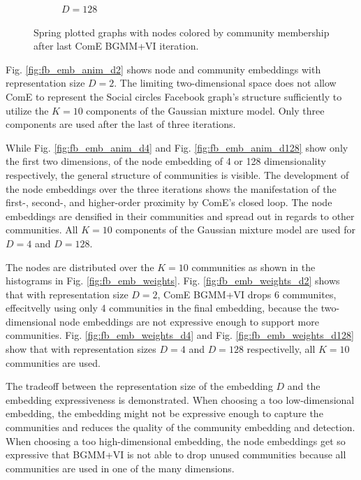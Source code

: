\documentclass[conference]{IEEEtran}
\begin{document}
\begin{figure}[htbp]
\begin{subfigure}{.33\textwidth}
        \caption{$D=128$}
    \end{subfigure}%
    \caption{Spring plotted graphs with nodes colored by community membership after last ComE BGMM+VI iteration.}
    \label{fig:fb_graphs}
\end{figure}

Fig. \ref{fig:fb_emb_anim_d2} shows node and community embeddings with representation size $D=2$. The limiting two-dimensional space does not allow ComE to represent the Social circles Facebook graph's structure sufficiently to utilize the $K=10$ components of the Gaussian mixture model. Only three components are used after the last of three iterations.

While Fig. \ref{fig:fb_emb_anim_d4} and Fig. \ref{fig:fb_emb_anim_d128} show only the first two dimensions, of the node embedding of 4 or 128 dimensionality respectively, the general structure of communities is visible. The development of the node embeddings over the three iterations shows the manifestation of the first-, second-, and higher-order proximity by ComE's closed loop. The node embeddings are densified in their communities and spread out in regards to other communities. All $K=10$ components of the Gaussian mixture model are used for $D=4$ and $D=128$.

The nodes are distributed over the $K=10$ communities as shown in the histograms in Fig. \ref{fig:fb_emb_weights}. Fig. \ref{fig:fb_emb_weights_d2} shows that with representation size $D=2$, ComE BGMM+VI drops 6 communites, effecitvelly using only 4 communities in the final embedding, because the two-dimensional node embeddings are not expressive enough to support more communities. Fig. \ref{fig:fb_emb_weights_d4} and Fig. \ref{fig:fb_emb_weights_d128} show that with representation sizes $D=4$ and $D=128$ respectivelly, all $K=10$ communities are used.

The tradeoff between the representation size of the embedding $D$ and the embedding expressiveness is demonstrated. When choosing a too low-dimensional embedding, the embedding might not be expressive enough to capture the communities and reduces the quality of the community embedding and detection. When choosing a too high-dimensional embedding, the node embeddings get so expressive that BGMM+VI is not able to drop unused communities because all communities are used in one of the many dimensions.
\end{document}
